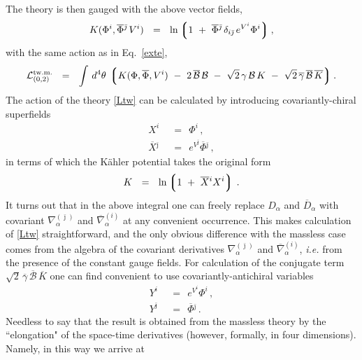 \documentclass[12pt]{article}
\def\beq{\begin{equation}}
\def\eeq{\end{equation}}
\newcommand{\ov}{\overline}
\newcommand{\mc}[1]{\mathcal{#1}}
\newcommand{\lgr}{\left\lgroup}
\newcommand{\rgr}{\right\rgroup}
\newcommand{\bj}{{\bar \jmath}}
\begin{document}
	The theory is then gauged with the above vector fields,
\[
	K(\Phi^i, \ov{\Phi}{}^\bj\, V^i) ~~=~~
		\ln \lgr 1 ~+~ \ov{\Phi}{}^\bj\, \delta_{i\bj}\, e^{V^i} \Phi^i \rgr ,
\]	
	with the same action as in Eq.~\eqref{exte},
\beq
\label{Ltw}
	\mc{L}_{(0,2)}^\text{tw.m.} ~~=~~ \int\, d^4\theta\, \lgr K(\Phi,\ov{\Phi}, V^i) 
		~-~ 2\, \ov{\mc{B}}\,\mc{B}  
		~-~  \sqrt{2}\, \gamma\,\mc{B}\,K  ~-~ \sqrt{2}\, \ov{\gamma}\,\ov{\mc{B}}\,\ov{K} \rgr.
\eeq
	The action of the theory \eqref{Ltw} can be calculated by introducing covariantly-chiral superfields
\begin{align*}
%
	X^i & ~~=~~ \Phi^i\,, \\
%
	\ov{X}{}^\bj & ~~=~~ e^{V^\bj} \ov{\Phi}{}^\bj\,,
\end{align*}
	in terms of which the K\"{a}hler potential takes the original form
\[
	K ~~=~~ \ln \lgr 1 ~+~ \ov{X}{}^i X^i \rgr\,.
\]
	It turns out that in the above integral one can freely replace $ D_\alpha $ and $ \ov{D}{}_\alpha $ with
	covariant $ \nabla^{(\bj)}_\alpha $ and $ \ov{\nabla}{}^{(i)}_\alpha $ at any convenient occurrence.
	This makes calculation of \eqref{Ltw} straightforward, and the only obvious difference with the massless
	case comes from the algebra of the covariant derivatives $ \nabla^{(\bj)}_\alpha $ and 
	$ \ov{\nabla}{}^{(i)}_\alpha $, {\it i.e.} from the presence of the constant gauge fields.
	For calculation of the conjugate term $ \sqrt{2}\, \ov{\gamma}\,\ov{\mc{B}}\,\ov{K} $ one can find convenient to 
	use covariantly-antichiral variables
\begin{align*}
%
	Y^i & ~~=~~ e^{V^i} \Phi^i\,, \\
%
	Y^\bj & ~~=~~ \ov{\Phi}{}^\bj\,.
\end{align*}
	Needless to say that the result is obtained from the massless theory by the ``elongation" 
	of the space-time derivatives (however, formally, in four dimensions). Namely, in this way we arrive at
\end{document}
